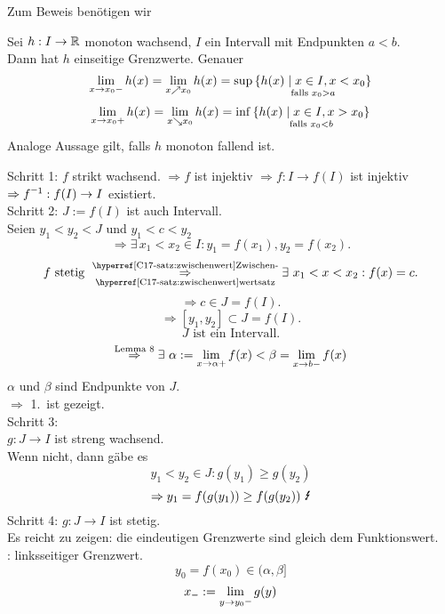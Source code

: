 \documentclass[../ana1.tex]{subfiles}
\begin{document}
\begin{prosa}
    Zum Beweis benötigen wir 
\end{prosa}
\begin{lem}\label{satz:monoton_grenzwert}
    Sei \( h: I \rightarrow \mathbb{R} \) monoton wachsend, \(I\) ein Intervall mit 
    Endpunkten \( a < b \).\\
    Dann hat \(h\) einseitige Grenzwerte. Genauer
    \[ \lim\limits_{x\rightarrow x_0 -} h(x) = \lim\limits_{x \nearrow x_0} h(x) 
    = \sup \underset{\text{falls } x_0 > a}{\{ h(x) 
    \; \vert \; x \in I, x < x_0 \}} \]
    \[ \lim\limits_{x\rightarrow x_0 +} h(x) = \lim\limits_{x \searrow x_0} h(x) 
    = \inf \underset{\text{falls } x_0 < b}{\{ h(x) 
    \; \vert \; x \in I, x > x_0 \}} \]
    Analoge Aussage gilt, falls \(h\) monoton fallend ist.
\end{lem}
\begin{bew}
    Schritt 1: \(f\) strikt wachsend. 
    \( \Rightarrow f \) ist injektiv \( \Rightarrow f : 
    I \rightarrow f(I) \) ist injektiv \( \Rightarrow \inverse{f} : 
    f(I) \rightarrow I \) existiert.\\
    Schritt 2: \( J := f(I) \) ist auch Intervall.\\
    Seien \( y_1 < y_2 < J \) und \( y_1 < c < y_2 \)
    \[ \Rightarrow \exists \, x_1 < x_2 \in I : y_1 = f(x_1), 
    y_2 = f(x_2). \]
    \[ f \text{ stetig } 
    \overunderref{C17-satz:zwischenwert}{Zwischen-}{wertsatz}{\Rightarrow}
    \exists \, x_1 < x < x_2: f(x) = c. \]
    \[ \Rightarrow c \in J = f(I). \]
    \[ \Rightarrow [y_1, y_2] \subset J = f(I). \]
    \[ J \text{ ist ein Intervall.} \]
    \[ \oversett{Lemma 8}{\Rightarrow} \exists \, \alpha := 
    \limesx{x}{\alpha +} f(x) < \beta = \limesx{x}{b -} f(x) \]
    \( \alpha \) und \( \beta \) sind Endpunkte von \(J\).\\ 
    \( \Rightarrow \) 1.\ ist gezeigt.\\
    Schritt 3: \\
    \( g: J \rightarrow I \) ist streng wachsend.\\
    Wenn nicht, dann gäbe es 
    \[ y_1 < y_2 \in J : g(y_1) \geq g(y_2) \]
    \[ \Rightarrow y_1 = f(g(y_1)) \geq f(g(y_2)) \text{ \Lightning{}} \]
    Schritt 4: \( g: J \rightarrow I \) ist stetig.\\
    Es reicht zu zeigen: die eindeutigen Grenzwerte sind gleich dem 
    Funktionswert.\\
    \Obda: linksseitiger Grenzwert.
    \[ y_0 = f(x_0) \in (\alpha, \beta] \]
    \[ x_{\minus} := \limesx{y}{y_0 \minus} g(y) 
\]
\end{bew}
\end{document}
